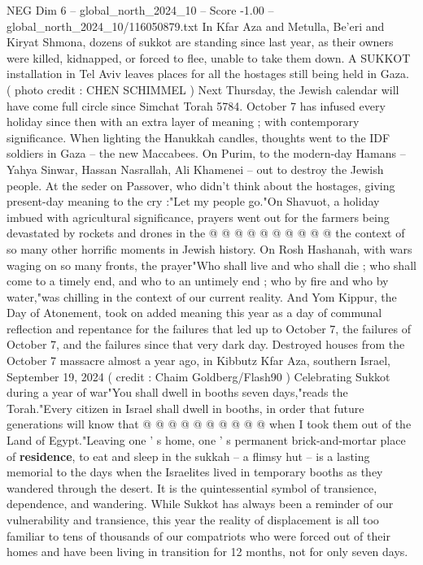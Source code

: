\begin{textsample}{NEG Dim 6 – global\_north\_2024\_10 – Score -1.00 – global\_north\_2024\_10/116050879.txt}  \label{ex:f6_neg_086}
In Kfar Aza and Metulla, Be'eri and Kiryat Shmona, dozens of sukkot are standing since last year, as their owners were killed, kidnapped, or forced to flee, unable to take them down.
A SUKKOT installation in Tel Aviv leaves places for all the hostages still being held in Gaza. ( photo credit : CHEN SCHIMMEL ) Next Thursday, the Jewish calendar will have come full circle since Simchat Torah 5784.
October 7 has infused every holiday since then with an extra layer of meaning ; with contemporary significance.
When lighting the Hanukkah candles, thoughts went to the IDF soldiers in Gaza -- the new Maccabees.
On Purim, to the modern-day Hamans -- Yahya Sinwar, Hassan Nasrallah, Ali Khamenei -- out to destroy the Jewish people.
At the seder on Passover, who didn't think about the hostages, giving present-day meaning to the cry :"Let my people go."On Shavuot, a holiday imbued with agricultural significance, prayers went out for the farmers being devastated by rockets and drones in the @ @ @ @ @ @ @ @ @ @ the context of so many other horrific moments in Jewish history.
On Rosh Hashanah, with wars waging on so many fronts, the prayer"Who shall live and who shall die ; who shall come to a timely end, and who to an untimely end ; who by fire and who by water,"was chilling in the context of our current reality.
And Yom Kippur, the Day of Atonement, took on added meaning this year as a day of communal reflection and repentance for the failures that led up to October 7, the failures of October 7, and the failures since that very dark day.
Destroyed houses from the October 7 massacre almost a year ago, in Kibbutz Kfar Aza, southern Israel, September 19, 2024 ( credit : Chaim Goldberg/Flash90 ) Celebrating Sukkot during a year of war"You shall dwell in booths seven days,"reads the Torah."Every citizen in Israel shall dwell in booths, in order that future generations will know that @ @ @ @ @ @ @ @ @ @ when I took them out of the Land of Egypt."Leaving one ' s home, one ' s permanent brick-and-mortar place of \textbf{residence}, to eat and sleep in the sukkah -- a flimsy hut -- is a lasting memorial to the days when the Israelites lived in temporary booths as they wandered through the desert.
It is the quintessential symbol of transience, dependence, and wandering.
While Sukkot has always been a reminder of our vulnerability and transience, this year the reality of displacement is all too familiar to tens of thousands of our compatriots who were forced out of their homes and have been living in transition for 12 months, not for only seven days.

\end{textsample}
